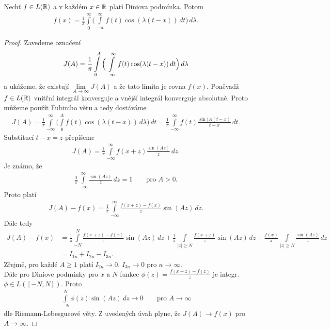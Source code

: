 \begin{theorem}
\label{v_6.3}
Nechť $f \in L(\mathbb{R})$ a v každém $x \in \mathbb{R}$ platí Diniova podmínka. Potom 
\begin{align}\label{vztah_6.1}
f(x)=\frac{1}{\pi} \int \limits _0^{\infty} \Big( \int \limits _{-\infty}^{\infty} f(t)\cos(\lambda (t-x)) \, dt \Big) \, d \lambda.
\end{align}
\end{theorem}

\begin{proof}
Zavedeme označení 
\begin{align}
J(A)=\frac{1}{\pi}  \int \limits _{0}^A \Big(\int \limits\limits_{-\infty}^{\infty} f(t) \cos ( \lambda (t-x)) \, dt \Big) \, d\lambda
\end{align}
a ukážeme, že existují $\lim \limits _{A \to \infty} J(A)$ a že tato limita je rovna $f(x)$. Poněvadž $f \in L(\mathbb{R})$ vnitřní integrál konverguje a vnější integrál konverguje absolutně. Proto m\r užeme použít Fubiniho větu a tedy dostáváme
\begin{align*}
J(A)=\frac{1}{\pi}\int \limits_{-\infty}^{\infty} \Big(\int \limits _0^A f(t) \cos (\lambda(t-x) )\, d \lambda \Big)\, dt=\frac{1}{\pi}\int \limits _{-\infty}^{\infty}
f(t) \frac{\sin(A(t-x)}{t-x} \, dt.
\end{align*}
Substitucí $t-x=z$ přepíšeme
\begin{align*}
J(A)=\frac{1}{\pi}\int \limits _{-\infty}^{\infty} f(x+z) \frac{\sin(Az)}{z} \, dz.
\end{align*}
Je známo, že
\begin{align*}
\frac{1}{\pi}\int \limits _{-\infty}^{\infty}\frac{\sin(Az)}{z}\, dz=1 \qquad \text{pro $A>0$.}
\end{align*}
Proto platí
\begin{align*}
J(A)-f(x)=\frac{1}{\pi}\int \limits _{-\infty}^{\infty} \frac{f(x+z)-f(x)}{z} \sin(Az) \, dz.
\end{align*}
Dále tedy
\begin{align*}
J(A)-f(x)&=\frac{1}{\pi}\int \limits _{-N}^{N} \frac{f(x+z)-f(x)}{z}\sin(Az) \, dz + \frac{1}{\pi} \int \limits _{|z|\geq N} \frac{f(x+z)}{z}\sin(Az)\, dz-\frac{f(x)}{\pi} \int \limits _{|z|\geq N}\frac{\sin(Az)}{z}\, dz\\
&=I_{1n}+I_{2n}-I_{3n}.
\end{align*}
Zřejmě, pro každé $A \geq 1$ platí $I_{2n} \to 0$, $I_{3n} \to 0$ pro $n \to \infty$.\\
Dále pro Diniove podmínky pro $x$ a $N$ funkce $\phi(z)=\frac{f(x+z)-f(z)}{z}$ je integr. $\phi \in L([-N,N])$. Proto 
\begin{align*}
\int \limits _{-N}^N \phi(z) \sin(Az) \, dz \to 0 \qquad \text{pro $A \to \infty$}
\end{align*}
dle Riemann-Lebesgueové věty. Z uvedených úvah plyne, že $J(A)\to f(x)$ pro $A \to \infty$.
 \end{proof}
 
